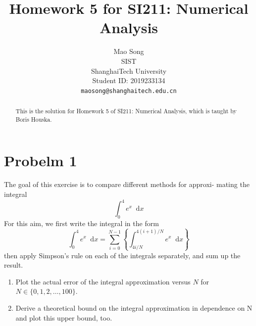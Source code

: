\documentclass{article}
\title{Homework 5 for SI211: Numerical Analysis}
\author{%
  {Mao Song} \\
  SIST\\
  ShanghaiTech University\\
  Student ID: 2019233134 \\
  \texttt{maosong@shanghaitech.edu.cn} \\
}
\newcommand*\diff{\mathop{}\!\mathrm{d}}
\theoremstyle{definition}
\begin{document}
\maketitle

\begin{abstract}
  This is the solution for Homework 5 of SI211: Numerical Analysis, which is taught by Boris Houska.

\end{abstract}

\section{Probelm 1}
The goal of this exercise is to compare different methods for approxi-
mating the integral
\begin{equation}
	\int_{0}^{4}e^x\diff x
\end{equation}
For this aim, we first write the integral in the form
\begin{equation}
	\int_{0}^{4}e^x\diff x=\sum_{i=0}^{N-1}\left\{\int_{4i/N}^{4(i+1)/N}e^x\diff x\right\}
\end{equation}
then apply Simpson’s rule on each of the integrals separately, and sum
up the result.
\begin{enumerate}
	\item Plot the actual error of the integral approximation versus $N$ for $N \in \{0, 1, 2, \dots, 100\}$.
	\item Derive a theoretical bound on the integral approximation in dependence on N and plot this upper bound, too.
\end{enumerate}
\end{document}
